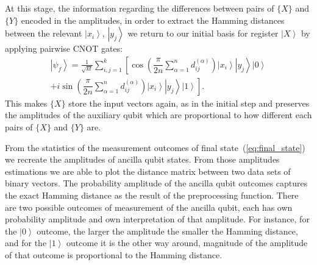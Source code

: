 \documentclass[pra,showkeys,twocolumn,showpacs]{revtex4-1}
\begin{document}
At this stage, the information regarding the differences between pairs of $\{X\}$ and $\{Y\}$ encoded in the amplitudes, in order to extract the Hamming distances between the relevant $\left| x_i \right\rangle$, $\left| y_j \right\rangle$ we return to our initial basis for register $\left| X \right\rangle$ by applying pairwise CNOT gates:
%
\begin{multline}
	\label{eq:final_state}
    \left| \psi_f \right\rangle =  
    \frac{1}{\sqrt{kl}}\sum\limits_{i, j=1}^{k} 
	\left[ 
	    \cos\left(
	        \dfrac{\pi}{2n}
	        \sum\limits_{\alpha=1}^n d^{(\alpha)}_{ij} 
	    \right)
        \left| x_i \right\rangle 
        \left| y_j \right\rangle 
        \left| 0 \right\rangle\right.
        \\+
        \left. i \sin\left(
            \dfrac{\pi}{2n}
            \sum\limits_{\alpha=1}^n d^{(\alpha)}_{ij} 
        \right)
        \left| x_i \right\rangle 
        \left| y_j \right\rangle 
        \left| 1 \right\rangle
    \right] .
\end{multline}
%
This makes $\{X\}$ store the input vectors again, as in the initial step 
and preserves the amplitudes of the auxiliary qubit which are proportional to how different each pairs of $\{X\}$ and $\{Y\}$ are.

From the statistics of the measurement outcomes of final state~(\ref{eq:final_state}) we recreate the amplitudes of ancilla qubit states. 
From those amplitudes estimations we are able to plot the distance matrix between two data sets of binary vectors.
The probability amplitude of the ancilla qubit outcomes captures the exact Hamming distance as the result of the preprocessing function.
There are two possible outcomes of measurement of the ancilla qubit, each has own probability amplitude and own interpretation of that amplitude. 
For instance, for the $\left| 0 \right\rangle$ outcome, the larger the amplitude the smaller the Hamming distance, 
and for the $\left| 1 \right\rangle$ outcome it is the other way around, magnitude of the amplitude of that outcome is proportional to the Hamming distance.
\end{document}
